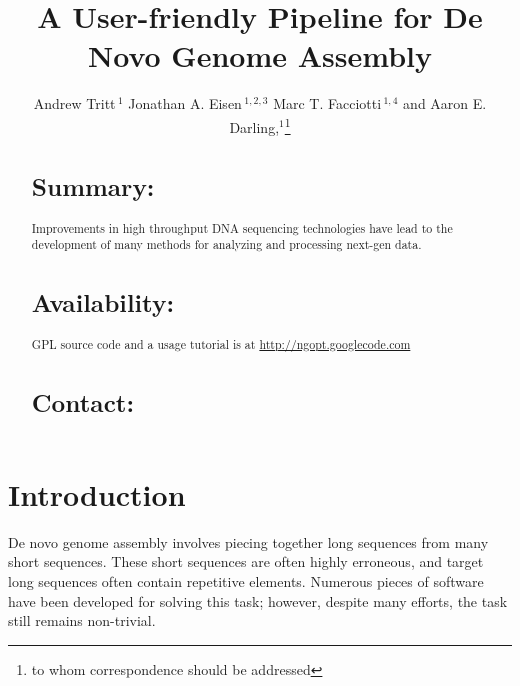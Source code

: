 \documentclass{bioinfo}
\begin{document}

\title[a5]{A User-friendly Pipeline for De Novo Genome Assembly}
\author[Tritt \textit{et~al}]{Andrew Tritt\,$^{1}$ Jonathan A. Eisen\,$^{1,2,3}$ Marc T. Facciotti\,$^{1,4}$ and Aaron E. Darling,$^{1}$\footnote{to whom correspondence should be addressed}}
\address{$^{1}$Genome Center, $^{2}$ Dept. of Evolution and Ecology, $^{3}$ Medical Microbiology and Immunology, 
$^{4}$ Biomedical Engineering, University of California-Davis, Davis, CA 95616.}



\maketitle

\begin{abstract}

\section{Summary:}
Improvements in high throughput DNA sequencing technologies have lead to the development of
many methods for analyzing and processing next-gen data. 
\section{Availability:}
GPL source code and a usage tutorial is at \href{http://ngopt.googlecode.com}{http://ngopt.googlecode.com}

\section{Contact:} \href{rabid apes}{}
\end{abstract}

\section{Introduction}
De novo genome assembly involves piecing together long sequences from many short sequences.
These short sequences are often highly erroneous, and target long sequences often contain repetitive 
elements. Numerous pieces of software have been developed for solving this task; however, despite
many efforts, the task still remains non-trivial. 
\end{document}
